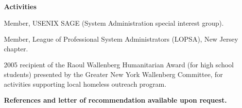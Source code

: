 \documentclass[letterpaper,11pt]{article}
\newcommand{\resheading}[1]{{\large \colorbox{mygrey}{\begin{minipage}{\textwidth}{\textbf{#1 \vphantom{p\^{E}}}}\end{minipage}}}}
\begin{document}
\resheading{Activities}
	\begin{description}
		\item Member, USENIX SAGE (System Administration special
                  interest group).
                \item Member, League of Professional System Administrators
                  (LOPSA), New Jersey chapter.
                \item 2005 recipient of the Raoul Wallenberg Humanitarian
                  Award (for high school students) presented by the Greater
                  New York Wallenberg Committee, for activities supporting
                  local homeless outreach program.
	\end{description}

\textbf{References and letter of recommendation available upon request.}

\end{document}
